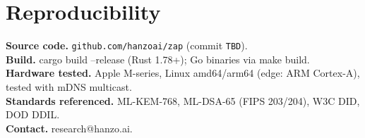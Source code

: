 \documentclass[11pt,letterpaper]{article}
\begin{document}
\section*{Reproducibility}
\textbf{Source code.} \texttt{github.com/hanzoai/zap} (commit \texttt{TBD}).\\
\textbf{Build.} cargo build --release (Rust 1.78+); Go binaries via make build.\\
\textbf{Hardware tested.} Apple M-series, Linux amd64/arm64 (edge: ARM Cortex-A), tested with mDNS multicast.\\
\textbf{Standards referenced.} ML-KEM-768, ML-DSA-65 (FIPS 203/204), W3C DID, DOD DDIL.\\
\textbf{Contact.} research@hanzo.ai.
\end{document}
